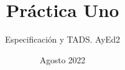 
\setlength{\parindent}{0pt}

\title{Práctica Uno}
\author{Especificación y TADS. AyEd2}
\date{Agosto 2022}



\maketitle






